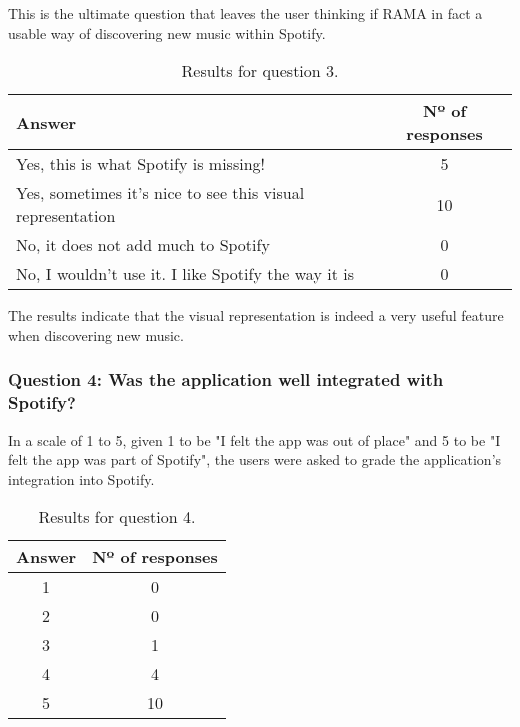     This is the ultimate question that leaves the user thinking if RAMA in fact a usable way of discovering new music within Spotify.

      \begin{table}[hb]
         \begin{center}
           \begin{tabular}{l|c}
       
           \hline
           \textbf{Answer} & \textbf{Nº of responses} \\
           \hline

           \hline
            Yes, this is what Spotify is missing! & 5 \\
            Yes, sometimes it's nice to see this visual representation & 10 \\
            No, it does not add much to Spotify & 0 \\
            No, I wouldn't use it. I like Spotify the way it is & 0 \\
           \hline
           \end{tabular}
         \end{center}
         \caption{Results for question 3.}
         \label{tab:question3}
       \end{table}

      The results indicate that the visual representation is indeed a very useful feature when discovering new music.

      \subsubsection{Question 4: Was the application well integrated with Spotify?}
      \label{ssub:question_4}

        In a scale of 1 to 5, given 1 to be "I felt the app was out of place" and 5 to be "I felt the app was part of Spotify", the users were asked to grade the application's integration into Spotify.

        \begin{table}[hb]
           \begin{center}
             \begin{tabular}{c|c}
         
             \hline
             \textbf{Answer} & \textbf{Nº of responses} \\
             \hline

             \hline
             1 & 0 \\
             2 & 0 \\
             3 & 1 \\
             4 & 4 \\
             5 & 10 \\
             \hline
             \end{tabular}
           \end{center}
           \caption{Results for question 4.}
           \label{tab:question4}
         \end{table}

